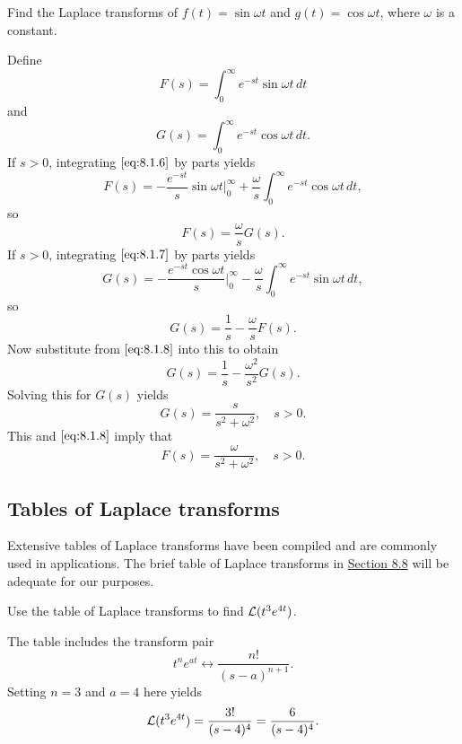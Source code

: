 \documentclass{ximera}
\begin{document}
\begin{example}\label{example:8.1.4} 
Find the Laplace transforms of $f(t)=\sin\omega t$ and
$g(t)=\cos\omega t$, where $\omega$ is a constant.

\begin{explanation}  
Define
\begin{equation}\label{eq:8.1.6}
F(s)=\int_0^\infty e^{-st}\sin\omega t\,dt
\end{equation}
and
\begin{equation}\label{eq:8.1.7}
G(s)=\int_0^\infty e^{-st}\cos\omega t\,dt.
\end{equation}
If $s>0$, integrating  $\eqref{eq:8.1.6}$ by parts yields
$$
F(s)=-\frac{e^{-st}}{s}\sin\omega t\Big|_0^\infty+\frac{\omega}{s}
\int_0^\infty e^{-st}\cos\omega t\,dt,
$$
so
\begin{equation}\label{eq:8.1.8}
F(s)=\frac{\omega}{s}G(s).
\end{equation}
If $s>0$, integrating  $\eqref{eq:8.1.7}$ by parts yields
$$
G(s)=-\frac{e^{-st}\cos\omega t}{s}\Big|_0^\infty - \frac{\omega}{s}
\int_0^\infty e^{-st}\sin\omega t\,dt,
$$
so
$$
G(s)=\frac{1}{s} - \frac{\omega}{s} F(s).
$$
Now substitute from  $\eqref{eq:8.1.8}$ into this to obtain
$$
G(s)=\frac{1}{s} - \frac{\omega^2}{s^2} G(s).
$$
Solving this for $G(s)$ yields
$$
G(s)=\frac{s}{s^2+\omega^2},\quad s>0.
$$
This and $\eqref{eq:8.1.8}$ imply that
$$
F(s)=\frac{\omega}{s^2+\omega^2},\quad s>0.
$$
\end{explanation}
\end{example}
\subsection*{Tables of Laplace transforms}

Extensive tables of Laplace transforms have been compiled and are
commonly used in applications. The brief table of Laplace transforms
in \href{https://xerxes.ximera.org/differentialequations/main/laplaceTable/laplaceTable}{Section 8.8} 
will be adequate for our purposes.

\begin{example}\label{example:8.1.5}  Use the
table of Laplace transforms to find  ${\cal L}(t^3e^{4t})$.

\begin{explanation}
The table includes the transform pair
$$
t^ne^{at}\leftrightarrow \frac{n!}{(s-a)^{n+1}}.
$$
Setting $n=3$ and $a=4$ here yields
$$
{\cal L}(t^3e^{4t})=\frac{3!}{(s-4)^4}=\frac{6}{(s-4)^4}.
$$
\end{explanation}
\end{example}
\end{document}

